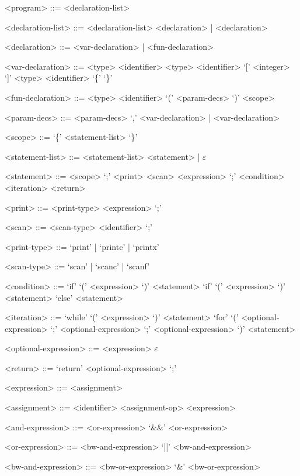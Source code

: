 \documentclass[
	article,			%
	11pt,				%
	oneside,			%
	a4paper,			%
	english,			%
	brazil,				%
	sumario=tradicional
	]{abntex2}
\begin{document}
\begin{grammar}
	
	<program> ::= <declaration-list>
		
	<declaration-list> ::= <declaration-list> <declaration> | <declaration>
	
	<declaration> ::= <var-declaration> | <fun-declaration>
	
	<var-declaration> ::= <type> <identifier> 
	\alt <type> <identifier> `[' <integer> `]' 
	\alt <type> <identifier> `\{' `\}' 
	
	<fun-declaration> ::= <type> <identifier> `(' <param-decs> `)' <scope>
		
	<param-decs> ::= <param-decs> `,' <var-declaration> | <var-declaration>
	
	<scope> ::= `\{' <statement-list> `\}'
	
	<statement-list> ::= <statement-list> <statement> | $\varepsilon$
	
	<statement> ::= <scope>
	\alt <var-declaration> `;'
	\alt <print>
	\alt <scan>
	\alt <expression> `;'
	\alt <condition>
	\alt <iteration>
	\alt <return>
	
	<print> ::= <print-type> <expression> `;'

	<scan> ::= <scan-type> <identifier> `;'

	<print-type> ::= `print' | `printc' | `printx'

	<scan-type> ::= `scan' | `scanc' | `scanf'	

	<condition> ::= `if' `(' <expression> `)' <statement>
	\alt `if' `(' <expression> `)' <statement> `else' <statement>
		
	<iteration> ::= `while' `(' <expression> `)' <statement>
	\alt `for' `(' <optional-expression> `;' <optional-expression> `;' <optional-expression> `)' <statement>

	<optional-expression> ::= <expression>
	\alt $\varepsilon$

	<return> ::= `return' <optional-expression> `;'
	
	<expression> ::= <assignment>
	\alt <and-expression>

	<assignment> ::= <identifier> <assignment-op> <expression>
	
	<and-expression> ::= <or-expression>
	\alt <and-expression> `&&' <or-expression>
	
	<or-expression> ::= <bw-and-expression>
	\alt <or-expression> `||' <bw-and-expression>
	
	<bw-and-expression> ::= <bw-or-expression>
	\alt <bw-and-expression> `&' <bw-or-expression>
	

\end{grammar}
\end{document}
